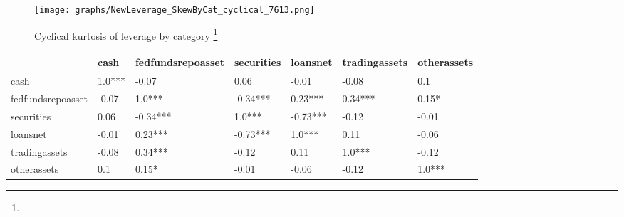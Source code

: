 \documentclass[12pt, a4paper]{article} %
\begin{document}
\begin{figure}[hbtp]
\begin{minipage}{\textwidth}
\centering
\caption[1]{Cyclical kurtosis of leverage by category \footnote{}}
\texttt{[image: graphs/NewLeverage\_SkewByCat\_cyclical\_7613.png]}
\label{fig:averageLeverage_skew_cyclical_Categories}
\end{minipage}
\end{figure}

\begin{tabular}{lllllll}
\toprule
{} &    cash & fedfundsrepoasset & securities &  loansnet & tradingassets & otherassets \\
\midrule
cash              &  1.0*** &             -0.07 &       0.06 &     -0.01 &         -0.08 &         0.1 \\
fedfundsrepoasset &   -0.07 &            1.0*** &   -0.34*** &   0.23*** &       0.34*** &       0.15* \\
securities        &    0.06 &          -0.34*** &     1.0*** &  -0.73*** &         -0.12 &       -0.01 \\
loansnet          &   -0.01 &           0.23*** &   -0.73*** &    1.0*** &          0.11 &       -0.06 \\
tradingassets     &   -0.08 &           0.34*** &      -0.12 &      0.11 &        1.0*** &       -0.12 \\
otherassets       &     0.1 &             0.15* &      -0.01 &     -0.06 &         -0.12 &      1.0*** \\
\bottomrule
\end{tabular}
\end{document}
